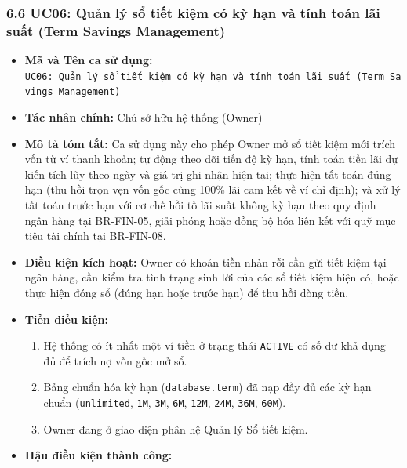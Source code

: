 \documentclass[11pt,a4paper]{article}
\providecommand{\tightlist}{
  \setlength{\itemsep}{0pt}\setlength{\parskip}{0pt}}
\begin{document}
\subsubsection{6.6 UC06: Quản lý sổ tiết kiệm có kỳ hạn và tính toán lãi
suất (Term Savings
Management)}\label{66-uc06-quux1ea3n-luxfd-sux1ed5-tiux1ebft-kiux1ec7m-cuxf3-kux1ef3-hux1ea1n-vuxe0-tuxednh-touxe1n-luxe3i-suux1ea5t-term-savings-management}

\begin{itemize}
\tightlist
\item
  \textbf{Mã và Tên ca sử dụng:}
  \texttt{UC06:\ Quản\ lý\ sổ\ tiết\ kiệm\ có\ kỳ\ hạn\ và\ tính\ toán\ lãi\ suất\ (Term\ Savings\ Management)}
\item
  \textbf{Tác nhân chính:} Chủ sở hữu hệ thống (Owner)
\item
  \textbf{Mô tả tóm tắt:} Ca sử dụng này cho phép Owner mở sổ tiết kiệm
  mới trích vốn từ ví thanh khoản; tự động theo dõi tiến độ kỳ hạn, tính
  toán tiền lãi dự kiến tích lũy theo ngày và giá trị ghi nhận hiện tại;
  thực hiện tất toán đúng hạn (thu hồi trọn vẹn vốn gốc cùng 100\% lãi
  cam kết về ví chỉ định); và xử lý tất toán trước hạn với cơ chế hồi tố
  lãi suất không kỳ hạn theo quy định ngân hàng tại BR-FIN-05, giải
  phóng hoặc đồng bộ hóa liên kết với quỹ mục tiêu tài chính tại
  BR-FIN-08.
\item
  \textbf{Điều kiện kích hoạt:} Owner có khoản tiền nhàn rỗi cần gửi
  tiết kiệm tại ngân hàng, cần kiểm tra tình trạng sinh lời của các sổ
  tiết kiệm hiện có, hoặc thực hiện đóng sổ (đúng hạn hoặc trước hạn) để
  thu hồi dòng tiền.
\item
  \textbf{Tiền điều kiện:}

  \begin{enumerate}
  \def\labelenumi{\arabic{enumi}.}
  \tightlist
  \item
    Hệ thống có ít nhất một ví tiền ở trạng thái \texttt{ACTIVE} có số
    dư khả dụng đủ để trích nợ vốn gốc mở sổ.
  \item
    Bảng chuẩn hóa kỳ hạn (\texttt{database.term}) đã nạp đầy đủ các kỳ
    hạn chuẩn (\texttt{unlimited}, \texttt{1M}, \texttt{3M},
    \texttt{6M}, \texttt{12M}, \texttt{24M}, \texttt{36M},
    \texttt{60M}).
  \item
    Owner đang ở giao diện phân hệ Quản lý Sổ tiết kiệm.
  \end{enumerate}
\item
  \textbf{Hậu điều kiện thành công:}


\end{itemize}
\end{document}
